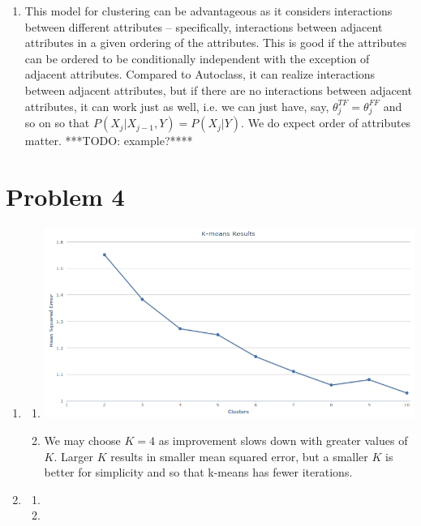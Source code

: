 \documentclass{article}
\begin{document}
\begin{enumerate}
\item This model for clustering can be advantageous as it considers interactions
  between different attributes -- specifically, interactions between adjacent
  attributes in a given ordering of the attributes. This is good if the 
  attributes can be ordered to be conditionally independent with the exception 
  of adjacent attributes. Compared to Autoclass, it can realize interactions
  between adjacent attributes, but if there are no interactions between adjacent
  attributes, it can work just as well, i.e. we can just have, say, 
  $\theta_j^{TF}=\theta_j^{FF}$ and so on so that $P(X_j|X_{j-1},Y)=P(X_j|Y)$. 
  We do expect order of attributes matter. ***TODO: example?****
\end{enumerate}
\section*{Problem 4}
\begin{enumerate}
\item 
  \begin{enumerate}
  \item \includegraphics[scale=0.5]{kmeansresults.png} 
  \item We may choose $K=4$ as improvement slows down with
    greater values of $K$. Larger $K$ results in smaller 
    mean squared error, but a smaller $K$ is better for 
    simplicity and so that k-means has fewer iterations. 
  \end{enumerate}
\item 
  \begin{enumerate}
  \item 
  \item 
  \end{enumerate}
\end{enumerate}
\end{document}

